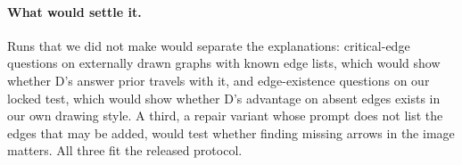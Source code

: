 \paragraph{What would settle it.}
Runs that we did not make would separate the explanations: critical-edge questions on
externally drawn graphs with known edge lists, which would show whether D's answer prior travels
with it, and edge-existence questions on our locked test, which would show whether D's advantage
on absent edges exists in our own drawing style. A third, a repair variant whose prompt does not
list the edges that may be added, would test whether finding missing arrows in the image matters.
All three fit the released protocol.
